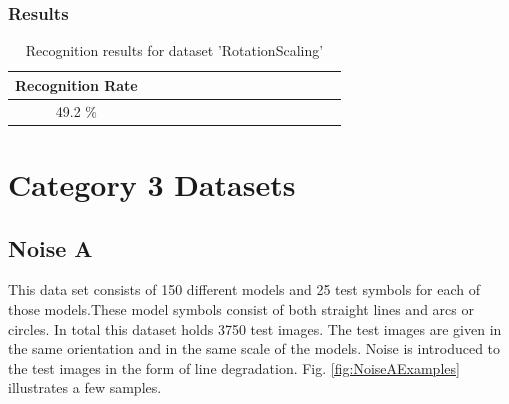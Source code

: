 \subsubsection{Results}
\begin{table}[H]
\centering
\caption{Recognition results for dataset 'RotationScaling'}
\begin{tabular}{ccccccccccccccc}
  \hline
      Recognition Rate \\
  \hline
      49.2 \% \\
  \hline
\end{tabular}
\end{table}
\vspace{85mm}


\section {Category 3 Datasets}
\subsection{Noise A}
This data set consists of 150 different models and 25 test symbols for each of those models.These model symbols consist of both straight lines and arcs or circles. In total this dataset holds 3750 test images. The test images are given in the same orientation and in the same scale of the models. Noise is introduced to the test images in the form of line degradation. Fig. \ref{fig:NoiseAExamples} illustrates a few samples.

